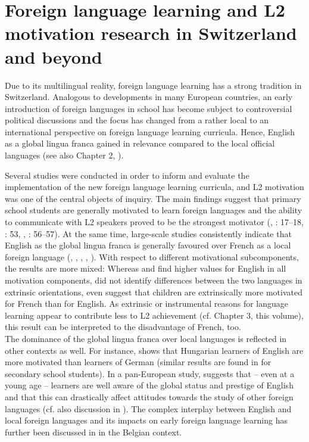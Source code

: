 \documentclass[output=paper]{langsci/langscibook}
\begin{document}
\section{Foreign language learning and L2 motivation research in Switzerland and beyond}\label{sec:07:3}

Due to its multilingual reality, foreign language learning has a strong tradition in Switzerland. Analogous to developments in many European countries, an early introduction of foreign languages in school has become subject to controversial political discussions and the focus has changed from a rather local to an international perspective on foreign language learning curricula. Hence, English as a global lingua franca gained in relevance compared to the local official languages (see also Chapter 2, ).

Several studies were conducted in order to inform and evaluate the implementation of the new foreign language learning curricula, and L2 motivation was one of the central objects of inquiry. The main findings suggest that primary school students are generally motivated to learn foreign languages and the ability to communicate with L2 speakers proved to be the strongest motivator (\citealt{BaderSchaer2005}, \citealt{HusfeldtBaderLehmann2009}: 17--18, \citealt{OwEtAl2012}: 53, \citealt{KreisEtAl2014}, \citealt{WiedenkellerLenz2019}: 56--57). At the same time, large-scale studies consistently indicate that English as the global lingua franca is generally favoured over French as a local foreign language (\citealt{Stoeckli2004}, \citealt{Heinzmann2010,Heinzmann2013}, \citealt{PeyerEtAl2016}, \citealt{BruehwilerLePapeRacine2017}, \citealt{PfenningerSingleton2017}). With respect to different motivational subcomponents, the results are more mixed: Whereas \citet[14--15]{Heinzmann2010} and \citet[6--7]{PeyerEtAl2016} find higher values for English in all motivation components, \citet[59--60]{Stoeckli2004} did not identify differences between the two languages in extrinsic orientations, \citet[173]{BruehwilerLePapeRacine2017} even suggest that children are extrinsically more motivated for French than for English. As extrinsic or instrumental reasons for language learning appear to contribute less to L2 achievement (cf. Chapter 3, this volume), this result can be interpreted to the disadvantage of French, too. \\
The dominance of the global lingua franca over local languages is reflected in other contexts as well. For instance, \citet[103--104]{Nikolov2009} shows that Hungarian learners of English are more motivated than learners of German (similar results are found in \citealt{CsizerLukacs2010} for secondary school students). In a pan-European study, \citet{Busse2017} suggests that – even at a young age -- learners are well aware of the global status and prestige of English and that this can drastically affect attitudes towards the study of other foreign languages (cf. also discussion in \citealt{Ushioda2017}). The complex interplay between English and local foreign languages and its impacts on early foreign language learning has further been discussed in \citet{BuylHousen2014} in the Belgian context.
\end{document}
